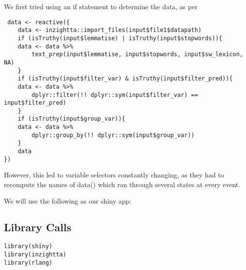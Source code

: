 \documentclass[a4paper, 11pt]{article}
\begin{document}
We first tried using an if statement to determine the data, as per
\begin{verbatim}
 data <- reactive({
    data <- inzightta::import_files(input$file1$datapath)
    if (isTruthy(input$lemmatise) | isTruthy(input$stopwords)){
	data <- data %>%
	    text_prep(input$lemmatise, input$stopwords, input$sw_lexicon, NA)
    }
    if (isTruthy(input$filter_var) & isTruthy(input$filter_pred)){
	data <- data %>%
	    dplyr::filter(!! dplyr::sym(input$filter_var) == input$filter_pred)
    }
    if (isTruthy(input$group_var)){
	data <- data %>%
	    dplyr::group_by(!! dplyr::sym(input$group_var))
    }
    data
})
\end{verbatim}
However, this led to variable selectors constantly changing, as they had to recompute the names of data() which ran through several states at every event.

We will use the following as our shiny app:
\subsection{Library Calls}
\label{sec:orgfb5c69c}
\begin{verbatim}
library(shiny)
library(inzightta)
library(rlang)
\end{verbatim}
\end{document}
